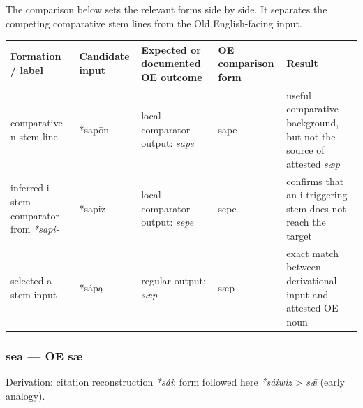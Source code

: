 \documentclass[
  british,
  a4paper,
]{article}
\newcounter{none} %
\begin{document}
The comparison below sets the relevant forms side by side. It separates
the competing comparative stem lines from the Old English-facing input.

{\def\LTcaptype{none} %
\begin{longtable}[]{@{}
  >{\raggedright\arraybackslash}p{}
  >{\raggedright\arraybackslash}p{}
  >{\raggedright\arraybackslash}p{}
  >{\raggedright\arraybackslash}p{}
  >{\raggedright\arraybackslash}p{}@{}}
\toprule\noalign{}
\begin{minipage}[b]{\linewidth}\raggedright
Formation / label
\end{minipage} & \begin{minipage}[b]{\linewidth}\raggedright
Candidate input
\end{minipage} & \begin{minipage}[b]{\linewidth}\raggedright
Expected or documented OE outcome
\end{minipage} & \begin{minipage}[b]{\linewidth}\raggedright
OE comparison form
\end{minipage} & \begin{minipage}[b]{\linewidth}\raggedright
Result
\end{minipage} \\
\midrule\noalign{}
\endhead
\bottomrule\noalign{}
\endlastfoot
comparative n-stem line & *sapōn & local comparator output: \emph{sape}
& sape & useful comparative background, but not the source of attested
\emph{sæp} \\
inferred i-stem comparator from \emph{*sapi-} & *sapiz & local
comparator output: \emph{sepe} & sepe & confirms that an i-triggering
stem does not reach the target \\
selected a-stem input & *sápą & regular output: \emph{sæp} & sæp & exact
match between derivational input and attested OE noun \\
\end{longtable}
}

\subsubsection{sea --- OE sǣ}\label{sea-oe-sux1e3}

Derivation: citation reconstruction \emph{*sái}; form followed here
\emph{*sáiwiz} \textgreater{} \emph{sǣ} (early analogy).
\end{document}
